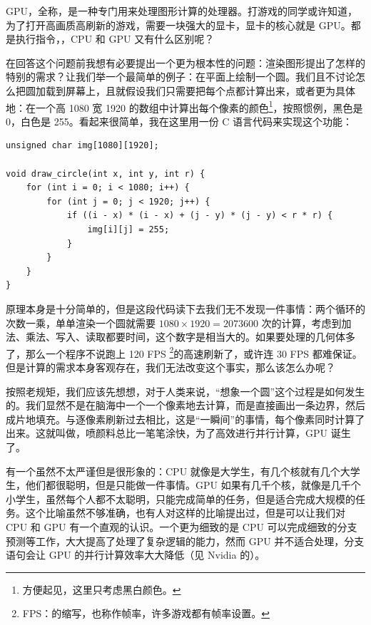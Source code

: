 GPU，全称，是一种专门用来处理图形计算的处理器。打游戏的同学或许知道，为了打开高画质高刷新的游戏，需要一块强大的显卡，显卡的核心就是 GPU。都是执行指令，，CPU 和 GPU 又有什么区别呢？

在回答这个问题前我想有必要提出一个更为根本性的问题：渲染图形提出了怎样的特别的需求？让我们举一个最简单的例子：在平面上绘制一个圆。我们且不讨论怎么把圆加载到屏幕上，且就假设我们只需要把每个点都计算出来，或者更为具体地：在一个高 1080 宽 1920 的数组中计算出每个像素的颜色\footnote{方便起见，这里只考虑黑白颜色。}，按照惯例，黑色是 0，白色是 255。看起来很简单，我在这里用一份 C 语言代码来实现这个功能：
\begin{verbatim}
unsigned char img[1080][1920];

void draw_circle(int x, int y, int r) {
    for (int i = 0; i < 1080; i++) {
        for (int j = 0; j < 1920; j++) {
            if ((i - x) * (i - x) + (j - y) * (j - y) < r * r) {
                img[i][j] = 255;
            }
        }
    }
}
\end{verbatim}

原理本身是十分简单的，但是这段代码读下去我们无不发现一件事情：两个循环的次数一乘，单单渲染一个圆就需要 $1080 \times 1920 = 2073600$ 次的计算，考虑到加法、乘法、写入、读取都要时间，这个数字是相当大的。如果要处理的几何体多了，那么一个程序不说跑上 120 FPS \footnote{FPS：的缩写，也称作帧率，许多游戏都有帧率设置。}的高速刷新了，或许连 30 FPS 都难保证。但是计算的需求本身客观存在，我们无法改变这个事实，那么该怎么办呢？

按照老规矩，我们应该先想想，对于人类来说，“想象一个圆”这个过程是如何发生的。我们显然不是在脑海中一个一个像素地去计算，而是直接画出一条边界，然后成片地填充。与逐像素刷新过去相比，这是“一瞬间”的事情，每个像素同时计算了出来。这就叫做，喷颜料总比一笔笔涂快，为了高效进行并行计算，GPU 诞生了。

有一个虽然不太严谨但是很形象的：CPU 就像是大学生，有几个核就有几个大学生，他们都很聪明，但是只能做一件事情。GPU 如果有几千个核，就像是几千个小学生，虽然每个人都不太聪明，只能完成简单的任务，但是适合完成大规模的任务。这个比喻虽然不够准确，也有人对这样的比喻提出过，但是可以让我们对 CPU 和 GPU 有一个直观的认识。一个更为细致的是 CPU 可以完成细致的分支预测等工作，大大提高了处理了复杂逻辑的能力，然而 GPU 并不适合处理，分支语句会让 GPU 的并行计算效率大大降低（见 Nvidia 的）。

